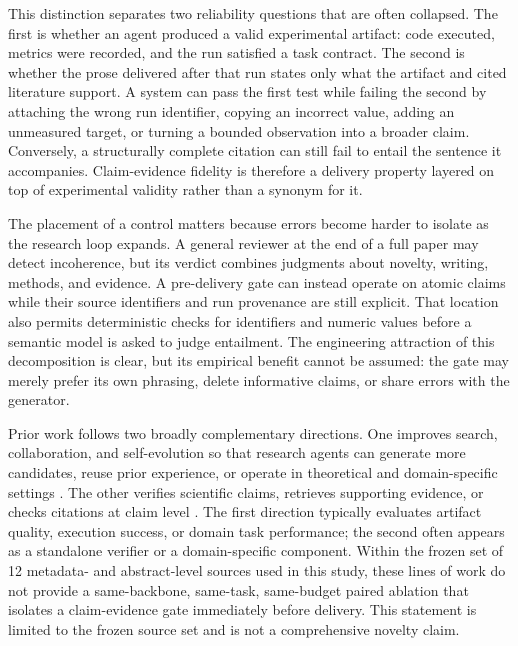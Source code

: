 \documentclass[11pt]{article}
\begin{document}
This distinction separates two reliability questions that are often collapsed. The first is whether an agent produced a valid experimental artifact: code executed, metrics were recorded, and the run satisfied a task contract. The second is whether the prose delivered after that run states only what the artifact and cited literature support. A system can pass the first test while failing the second by attaching the wrong run identifier, copying an incorrect value, adding an unmeasured target, or turning a bounded observation into a broader claim. Conversely, a structurally complete citation can still fail to entail the sentence it accompanies. Claim-evidence fidelity is therefore a delivery property layered on top of experimental validity rather than a synonym for it.

The placement of a control matters because errors become harder to isolate as the research loop expands. A general reviewer at the end of a full paper may detect incoherence, but its verdict combines judgments about novelty, writing, methods, and evidence. A pre-delivery gate can instead operate on atomic claims while their source identifiers and run provenance are still explicit. That location also permits deterministic checks for identifiers and numeric values before a semantic model is asked to judge entailment. The engineering attraction of this decomposition is clear, but its empirical benefit cannot be assumed: the gate may merely prefer its own phrasing, delete informative claims, or share errors with the generator.

Prior work follows two broadly complementary directions. One improves search, collaboration, and self-evolution so that research agents can generate more candidates, reuse prior experience, or operate in theoretical and domain-specific settings \cite{evo,nova,hypo,reasflow,triagent,medagent}. The other verifies scientific claims, retrieves supporting evidence, or checks citations at claim level \cite{cliver,ece,reflens}. The first direction typically evaluates artifact quality, execution success, or domain task performance; the second often appears as a standalone verifier or a domain-specific component. Within the frozen set of 12 metadata- and abstract-level sources used in this study, these lines of work do not provide a same-backbone, same-task, same-budget paired ablation that isolates a claim-evidence gate immediately before delivery. This statement is limited to the frozen source set and is not a comprehensive novelty claim.
\end{document}
